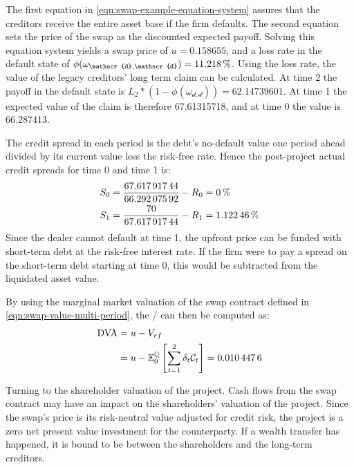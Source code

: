 \documentclass[main.tex]{subfiles}
\begin{document}
        The first equation in \cref{eqn:swap-example-equation-system} assures that the creditors receive the entire asset base if the firm defaults.
        The second equation sets the price of the swap as the discounted expected payoff.
        Solving this equation system yields a swap price of $u=\num{0.158655}$,
        and a loss rate in the default state of 
        $\phi(\omega_{\mathscr{d},\mathscr{d}})=\pct{0.112180}$.
        Using the loss rate, the value of the legacy creditors' long term claim can be calculated.
        At time 2 the payoff in the default state is 
        $L_{2}*(1-\phi(\omega_{\mathscr{d},\mathscr{d}})) = \num{62.14739601}$.
        At time 1 the expected value of the claim is therefore \num{67.61315718},
        and at time 0 the value is \num{66.287413}.

        The credit spread in each period is the debt's no-default value one period ahead
        divided by its current value less the risk-free rate.
        Hence the post-project actual credit spreads for time 0 and time 1 is:
        \begin{align}
            S_{0} 
            &=
            \frac{
                \num{67.61791744}
            }{
                \num{66.29207592}
            }
            -
            R_{0}
            =
            \pct{0}
            \\
            S_{1} 
            &= 
            \frac{
                \num{70}
            }{
                \num{67.61791744}
            } 
            -
            R_{1}
            =
            \pct{0.0112246}
        \end{align}
        Since the dealer cannot default at time 1,
        the upfront price can be funded with short-term debt at the risk-free interest rate.
        If the firm were to pay a spread on the short-term debt starting at time 0,
        this would be subtracted from the liquidated asset value. 

        By using the marginal market valuation of the swap contract
        defined in \cref{eqn:swap-value-multi-period},
        the \DVA/ can then be computed as:
        \begin{align}
            \DVA/ &= u - V_{rf}
            \nonumber
            \\
            &= u - \mathbb{E}_{0}^{\rnmeasure}\left[\sum_{t=1}^{2}\delta_t \mathcal{C}_t\right]
            = \num{0.0104476}
        \end{align}

        Turning to the shareholder valuation of the project.
        Cash flows from the swap contract may have an impact on the shareholders' valuation of the project.
        Since the swap's price is its risk-neutral value adjusted for credit risk,
        the project is a zero net present value investment for the counterparty.
        If a wealth transfer has happened, it is bound to be between the shareholders and the long-term creditors.
\end{document}
